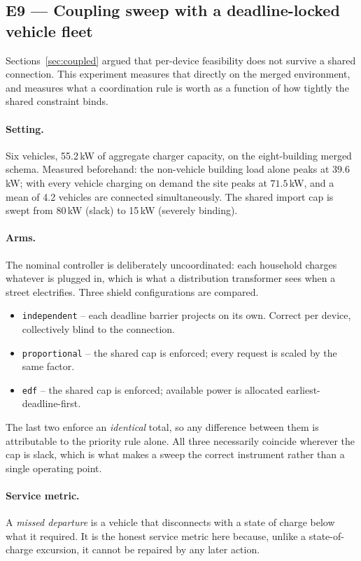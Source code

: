 \documentclass[11pt]{article}
\begin{document}
\subsection{E9 --- Coupling sweep with a deadline-locked vehicle fleet}
\label{sec:exp-coupling}

Sections~\ref{sec:coupled} argued that per-device feasibility does not survive a
shared connection. This experiment measures that directly on the merged
environment, and measures what a coordination rule is worth as a function of how
tightly the shared constraint binds.

\paragraph{Setting.} Six vehicles, 55.2\,kW of aggregate charger capacity, on the
eight-building merged schema. Measured beforehand: the non-vehicle building load
alone peaks at $39.6$\,kW; with every vehicle charging on demand the site peaks
at $71.5$\,kW, and a mean of 4.2 vehicles are connected simultaneously. The
shared import cap is swept from 80\,kW (slack) to 15\,kW (severely binding).

\paragraph{Arms.} The nominal controller is deliberately uncoordinated: each
household charges whatever is plugged in, which is what a distribution
transformer sees when a street electrifies. Three shield configurations are
compared.

\begin{itemize}[nosep]
\item \texttt{independent} -- each deadline barrier projects on its own. Correct
per device, collectively blind to the connection.
\item \texttt{proportional} -- the shared cap is enforced; every request is scaled
by the same factor.
\item \texttt{edf} -- the shared cap is enforced; available power is allocated
earliest-deadline-first.
\end{itemize}

The last two enforce an \emph{identical} total, so any difference between them is
attributable to the priority rule alone. All three necessarily coincide wherever
the cap is slack, which is what makes a sweep the correct instrument rather than
a single operating point.

\paragraph{Service metric.} A \emph{missed departure} is a vehicle that
disconnects with a state of charge below what it required. It is the honest
service metric here because, unlike a state-of-charge excursion, it cannot be
repaired by any later action.
\end{document}
